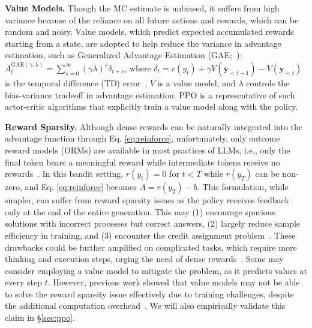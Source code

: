 \textbf{Value Models.} 
Though the MC estimate is unbiased, it suffers from high variance because of the reliance on all future actions and rewards, which can be random and noisy.
Value models, which predict expected accumulated rewards starting from a state, are adopted to help reduce the variance in advantage estimation, such as Generalized Advantage Estimation (GAE;~\citealp{SchulmanMLJA15}):
$A_t^{\text{GAE}(\gamma,\lambda)} = \sum_{s=0}^{\infty} (\gamma\lambda)^s \delta_{t+s}$,
where $\delta_t = r(y_t) + \gamma V(\mathbf{y}_{<t+1}) - V(\mathbf{y}_{<t})$ is the temporal difference (TD) error~\citep{sutton1988learning}, $V$ is a value model, and $\lambda$ controls the bias-variance tradeoff in advantage estimation.
PPO \citep{schulman2017proximal} is a representative of such actor-critic algorithms that explicitly train a value model along with the policy.

\textbf{Reward Sparsity.}
Although dense rewards can be naturally integrated into the advantage function through Eq. \ref{eq:reinforce},
unfortunately, only outcome reward models (ORMs) are available in most practices of LLMs, i.e., only the final token bears a meaningful reward while intermediate tokens receive no rewards~\citep{rafailov2024direct,deepseek-math,deepseekai2025deepseekr1incentivizingreasoningcapability}. In this bandit setting, $r(y_t)=0$ for $t<T$ while $r(y_T)$ can be non-zero, and Eq. \ref{eq:reinforce} becomes $A = r(y_T) - b$.
This formulation, while simpler, can suffer from reward sparsity issues as the policy receives feedback only at the end of the entire generation.
This may (1) encourage spurious solutions with incorrect processes but correct answers, (2) largely reduce sample efficiency in training, and (3) encounter the credit assignment problem~\citep{sutton2018reinforcement}.
These drawbacks could be further amplified on complicated tasks, which require more thinking and execution steps, urging the need of dense rewards~\citep{uesato2022solving,Lightman2023LetsVS}.
Some may consider employing a value model to mitigate the problem, as it predicts values at every step $t$. However, previous work showed that value models may not be able to solve the reward sparsity issue effectively due to training challenges, despite the additional computation overhead~\citep{deepseek-math,ahmadian2024back}. 
We will also empirically validate this claim in \S \ref{sec:ppo}.



